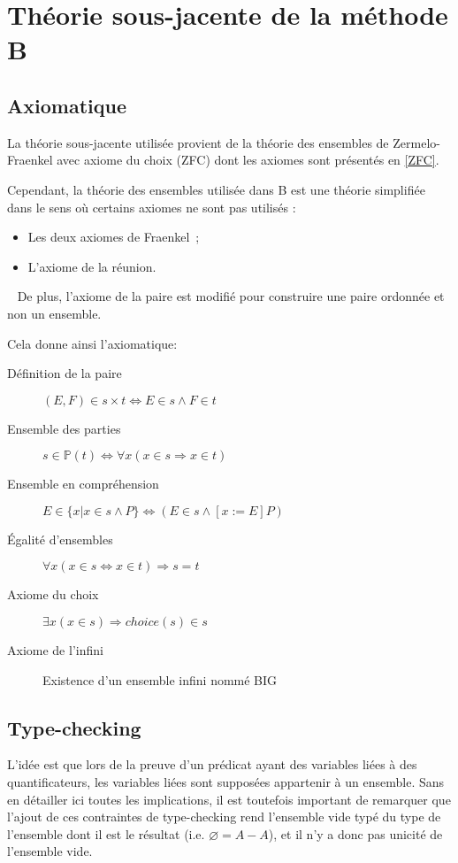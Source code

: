 \documentclass[10pt,a4paper]{article}
\begin{document}
\section{Théorie sous-jacente de la méthode B}

\subsection{Axiomatique}
La théorie sous-jacente utilisée provient de la théorie des ensembles de Zermelo-Fraenkel avec axiome du choix (ZFC) dont les axiomes sont présentés en \cref{ZFC}.


Cependant, la théorie des ensembles utilisée dans B est une théorie simplifiée dans le sens où certains axiomes ne sont pas utilisés :
\begin{itemize}
\item Les deux axiomes de  Fraenkel~;
\item L'axiome de la réunion.
\end{itemize}~\newline
De plus, l'axiome de la paire est modifié pour construire une paire ordonnée et non un ensemble.\newline

Cela donne ainsi l'axiomatique:
\begin{description}
\item[Définition de la paire] $(E, F) \in s \times t \Leftrightarrow E \in s \wedge F \in t$
\item[Ensemble des parties] $s \in \mathbb{P}(t) \Leftrightarrow \forall x (x \in s \Rightarrow x \in t)$
\item[Ensemble en compréhension] $E \in \{ x | x \in s \wedge P \} \Leftrightarrow (E \in s \wedge [x:= E] P)$
\item[Égalité d'ensembles] $\forall x (x \in s \Leftrightarrow x \in t) \Rightarrow s = t$
\item[Axiome du choix] $\exists x  (x \in s) \Rightarrow choice(s) \in s$
\item[Axiome de l'infini] Existence d'un ensemble infini nommé BIG
\end{description}

\subsection{Type-checking}

L'idée est que lors de la preuve d'un prédicat ayant des variables liées à des quantificateurs, les variables liées sont supposées appartenir à un ensemble.
Sans en détailler ici toutes les implications, il est toutefois important de remarquer que l'ajout de ces contraintes de type-checking rend l'ensemble vide typé du type de l'ensemble dont il est le résultat (i.e. $\varnothing = A - A$), et il n'y a donc pas unicité de l'ensemble vide. 
\end{document}
